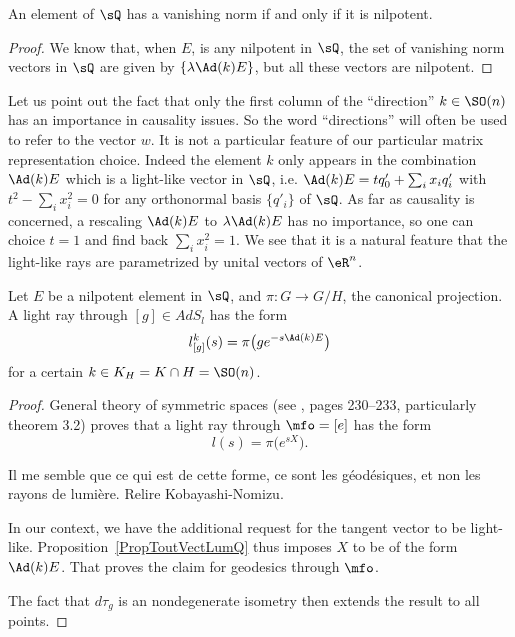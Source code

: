\begin{corollary}		\label{CorNormZeroEQnil}
	An element of $\sQ$ has a vanishing norm if and only if it is nilpotent.
\end{corollary}

\begin{proof}
	We know that, when $E$, is any nilpotent in $\sQ$, the set of vanishing norm vectors in $\sQ$ are given by $\{ \lambda\Ad(k)E \}$, but all these vectors are nilpotent.
\end{proof}

Let us point out the fact that only the first column of the ``direction''{} $k\in \SO(n)$ has an importance in causality issues. So the word ``directions''{} will often be used to refer to the vector $w$. It is not a particular feature of our particular matrix representation choice. Indeed the element $k$ only appears in the combination $\Ad(k)E$ which is a light-like vector in $\sQ$, i.e. $\Ad(k)E=tq'_0+\sum_i x_iq'_i$ with $t^2-\sum_i x_i^2=0$ for any orthonormal basis $\{q'_i\}$ of $\sQ$. As far as causality is concerned, a rescaling $\Ad(k)E$ to $\lambda\Ad(k)E$ has no importance, so one can choice $t=1$ and find back $\sum_i x_i^2=1$. We see that it is a natural feature that the light-like rays are parametrized by  unital vectors of $\eR^n$.

\begin{lemma}		\label{LemGeodGenreLumiere}
	Let $E$ be a nilpotent element in $\sQ$, and $\pi: G \rightarrow G/H$, the canonical projection. A light ray through $[g]\in AdS_l$ has the form
	\begin{equation}
		l^k_{[g]}(s)=\pi\big( ge^{-s\Ad(k)E} \big)
	\end{equation}
	for a certain $k\in K_H=K\cap H=\SO(n)$.
	\label{lem:AdkEcone}
\end{lemma}

\begin{proof}
	General theory of symmetric spaces (see \cite{kobayashi2}, pages 230--233, particularly theorem 3.2) proves that a light ray through $\mfo=[e]$ has the form
	\[
		l(s)=\pi\big( e^{sX} \big).
	\]

	\begin{probleme}
		Il me semble que ce qui est de cette forme, ce sont les géodésiques, et non les rayons de lumière. Relire Kobayashi-Nomizu.
	\end{probleme}


	In our context, we have the additional request for the tangent vector to be light-like. Proposition~\ref{PropToutVectLumQ} thus imposes $X$ to be of the form $\Ad(k)E$. That proves the claim for geodesics through $\mfo$.

	The fact that $d\tau_g$ is an nondegenerate isometry then extends the result to all points.

\end{proof}

